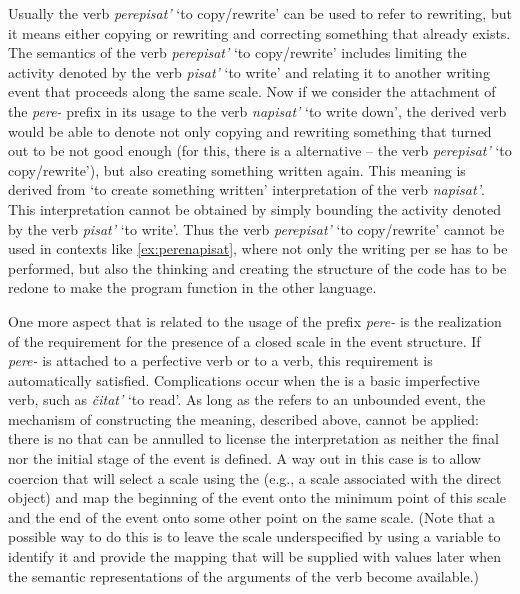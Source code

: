 Usually the verb \textit{perepisat'} `to copy/rewrite' can be used to refer to rewriting, but it means either copying or rewriting and correcting something that already exists. The semantics of the verb \textit{perepisat'} `to copy/rewrite' includes limiting the activity denoted by the verb \textit{pisat'} `to write' and relating it to another writing event that proceeds along the same scale. Now if we consider the attachment of the \textit{pere-} prefix in its  usage to the verb \textit{napisat'} `to write down', the derived verb would be able to denote not only copying and rewriting something that turned out to be not good enough (for this, there is a  alternative -- the verb \textit{perepisat'} `to copy/rewrite'), but also creating something written again. This meaning is derived from `to create something written' interpretation of the verb \textit{napisat'}. This interpretation cannot be obtained by simply bounding the activity denoted by the verb \textit{pisat'} `to write'. Thus the verb \textit{perepisat'} `to copy/rewrite' cannot be used in contexts like \ref{ex:perenapisat}, where not only the writing per se has to be performed, but also the thinking and creating the structure of the code has to be redone to make the program function in the other language.

One more aspect that is related to the  usage of the prefix \textit{pere-} is the realization of the requirement for the presence of a closed scale in the event structure. If \textit{pere-} is attached to a perfective verb or to a  verb, this requirement is automatically satisfied. Complications occur when the  is a basic imperfective verb, such as \textit{\v{c}itat'} `to read'. As long as the  refers to an unbounded event, the mechanism of constructing the  meaning, described above, cannot be applied: there is no  that can be annulled to license the  interpretation as neither the final nor the initial stage of the event is defined. A way out in this case is to allow coercion that will select a scale using the  (e.g., a scale associated with the direct object) and map the beginning of the event onto the minimum point of this scale and the end of the event onto some other point on the same scale. (Note that a possible way to do this is to leave the scale underspecified by using a variable to identify it and provide the mapping that will be supplied with values later when the semantic representations of the arguments of the verb become available.)

